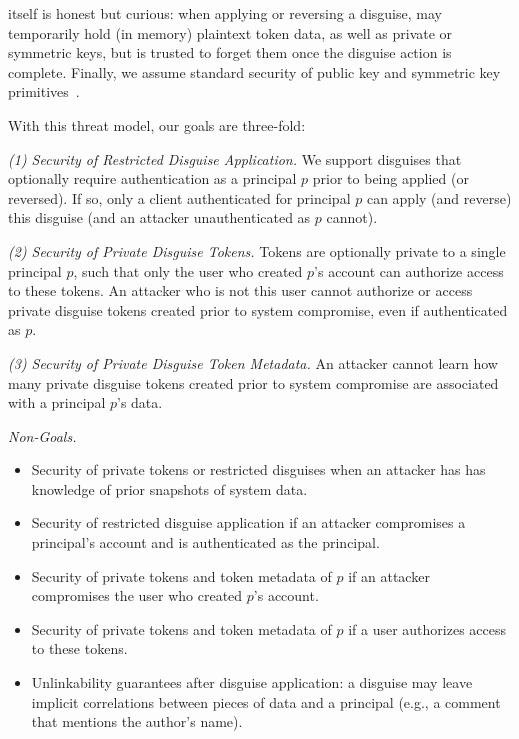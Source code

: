 \sys itself is honest but curious: when applying or reversing a disguise, \sys may temporarily
hold (in memory) plaintext token data, as well as private or symmetric keys, but is trusted to
forget them once the disguise action is complete. 
Finally, we assume standard security of public key and symmetric key primitives~.

With this threat model, our goals are three-fold: 

\vspace{6pt}\noindent\emph{(1) Security of Restricted Disguise Application.}
We support disguises that optionally require authentication as a principal $p$ prior to being
applied (or reversed). If so, only a client authenticated for principal $p$ can apply (and reverse) this disguise (and an
attacker unauthenticated as $p$ cannot).

\vspace{6pt}\noindent\emph{(2) Security of Private Disguise Tokens.} 
Tokens are optionally private to a single principal $p$, such that only the user who created
$p$'s account can authorize access to these tokens. An attacker who is not this user cannot
authorize or access private disguise tokens created prior to system compromise, even if authenticated as $p$.

\vspace{6pt}\noindent\emph{(3) Security of Private Disguise Token Metadata.}
An attacker cannot learn how many private disguise tokens created prior to system compromise are associated with a principal $p$'s data.

\vspace{6pt}\noindent\emph{Non-Goals.}
\begin{itemize}
    \item Security of private tokens or restricted disguises when an attacker has has knowledge of prior snapshots of system data.
    \item Security of restricted disguise application if an attacker compromises a principal's account
        and is authenticated as the principal.
    \item Security of private tokens and token metadata of $p$ if an attacker compromises the user
        who created $p$'s account.
    \item Security of private tokens and token metadata of $p$ if a user authorizes access to these
        tokens.
    \item Unlinkability guarantees after disguise application: a disguise may leave implicit
        correlations between pieces of data and a principal (e.g., a comment that mentions the author’s name).
\end{itemize}

